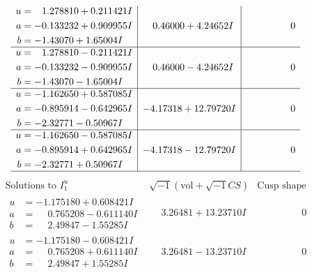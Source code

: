 \documentclass[1p]{elsarticle_modified}
\theoremstyle{definition}
\newcommand{\I}{\sqrt{-1}}
\begin{document}
$$\begin{array}{c|c|c}
\begin{aligned}
u &= \phantom{-}1.278810 + 0.211421 I \\
a &= -0.133232 + 0.909955 I \\
b &= -1.43070 + 1.65004 I\end{aligned}
 & \phantom{-}0.46000 + 4.24652 I & \phantom{-0.000000 } 0 \\ \hline\begin{aligned}
u &= \phantom{-}1.278810 - 0.211421 I \\
a &= -0.133232 - 0.909955 I \\
b &= -1.43070 - 1.65004 I\end{aligned}
 & \phantom{-}0.46000 - 4.24652 I & \phantom{-0.000000 } 0 \\ \hline\begin{aligned}
u &= -1.162650 + 0.587085 I \\
a &= -0.895914 - 0.642965 I \\
b &= -2.32771 - 0.50967 I\end{aligned}
 & -4.17318 + 12.79720 I & \phantom{-0.000000 } 0 \\ \hline\begin{aligned}
u &= -1.162650 - 0.587085 I \\
a &= -0.895914 + 0.642965 I \\
b &= -2.32771 + 0.50967 I\end{aligned}
 & -4.17318 - 12.79720 I & \phantom{-0.000000 } 0\\
 \hline 
 \end{array}$$\newpage$$\begin{array}{c|c|c}  
\text{Solutions to }I^u_{1}& \I (\text{vol} + \sqrt{-1}CS) & \text{Cusp shape}\\
 \hline 
\begin{aligned}
u &= -1.175180 + 0.608421 I \\
a &= \phantom{-}0.765208 - 0.611140 I \\
b &= \phantom{-}2.49847 - 1.55285 I\end{aligned}
 & \phantom{-}3.26481 + 13.23710 I & \phantom{-0.000000 } 0 \\ \hline\begin{aligned}
u &= -1.175180 - 0.608421 I \\
a &= \phantom{-}0.765208 + 0.611140 I \\
b &= \phantom{-}2.49847 + 1.55285 I\end{aligned}
 & \phantom{-}3.26481 - 13.23710 I & \phantom{-0.000000 } 0 \\ \hline\begin{aligned}

\end{aligned}
\end{array}$$
\end{document}
